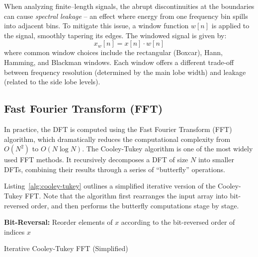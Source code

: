 \documentclass[12pt,letter]{article}
\begin{document}
When analyzing finite--length signals, the abrupt discontinuities at the
boundaries can cause \textit{spectral leakage} -- an effect where energy from
one frequency bin spills into adjacent bins. To mitigate this issue, a window
function $w[n]$ is applied to the signal, smoothly tapering its edges. The
windowed signal is given by:
\begin{equation}
x_w[n] = x[n] \cdot w[n]
\label{eqn:window}
\end{equation}
where common window choices include the rectangular (Boxcar), Hann, Hamming,
and Blackman windows. Each window offers a different trade-off between
frequency resolution (determined by the main lobe width) and leakage (related
to the side lobe levels).

\subsection{Fast Fourier Transform (FFT)}

In practice, the DFT is computed using the Fast Fourier Transform (FFT)
algorithm, which dramatically reduces the computational complexity from
$O(N^2)$ to $O(N \log N)$. The Cooley-Tukey algorithm is one of the most
widely used FFT methods. It recursively decomposes a DFT of size $N$ into
smaller DFTs, combining their results through a series of ``butterfly''
operations.

Listing~\ref{alg:cooley-tukey} outlines a simplified iterative version of the
Cooley-Tukey FFT. Note that the algorithm first rearranges the input array
into bit-reversed order, and then performs the butterfly computations stage
by stage.

\begin{algorithm}[H]
\SetAlgoLined
{}
\textbf{Bit-Reversal:} Reorder elements of \( x \) according to the bit-reversed order of indices\;
\Return \( x \)\;
\caption{Iterative Cooley-Tukey FFT (Simplified)}
\label{alg:cooley-tukey}
\end{algorithm}
\end{document}
